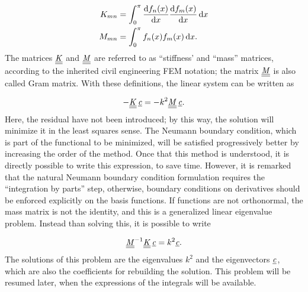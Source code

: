 \documentclass[a4paper,12pt]{article}
\begin{document}
\begin{align}
K_{mn} &= \int_0^\pi \frac{\mathrm{d} f_n(x)}{\mathrm{d} x} \frac{\mathrm{d} f_m(x)}{\mathrm{d} x} \, \mathrm{d} x \label{eq:stiffmatrixdef} \\
M_{mn} &= \int_0^\pi f_n(x) f_m(x) \, \mathrm{d} x \label{eq:massmatrixdef}.
\end{align}
The matrices $\underline{\underline{\mathit{K}}}$ and $\underline{\underline{\mathit{M}}}$ are referred to as ``stiffness' and ``mass'' matrices, according to the inherited civil engineering FEM notation; the matrix $\underline{\underline{\mathit{M}}}$ is also called Gram matrix. With these definitions, the linear system can be written as

\[
- \underline{\underline{\mathit{K}}} \, \underline{\mathit{c}} = - k^2 \underline{\underline{\mathit{M}}} \, \underline{\mathit{c}}.
\]
Here, the residual have not been introduced; by this way, the solution will minimize it in the least squares sense. The Neumann boundary condition, which is part of the functional to be minimized, will be satisfied progressively better by increasing the order of the method. Once that this method is understood, it is directly possible to write this expression, to save time. However, it is remarked that the natural Neumann boundary condition formulation requires the ``integration by parts'' step, otherwise, boundary conditions on derivatives should be enforced explicitly on the basis functions. If functions are not orthonormal, the mass matrix is not the identity, and this is a generalized linear eigenvalue problem. Instead than solving this, it is possible to write

\[
\underline{\underline{\mathit{M}}}^{-1} \underline{\underline{\mathit{K}}} \, \underline{\mathit{c}} = k^2 \underline{\mathit{c}}.
\]
The solutions of this problem are the eigenvalues $k^2$ and the eigenvectors $\underline{\mathit{c}}$, which are also the coefficients for rebuilding the solution. This problem will be resumed later, when the expressions of the integrals will be available.














\end{document}
